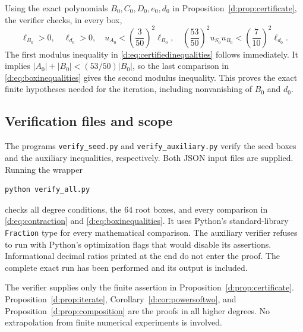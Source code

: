 \documentclass[UTF8,11pt]{ctexart}
\theoremstyle{definition}
\numberwithin{equation}{section}
\begin{document}
Using the exact polynomials $B_0,C_0,D_0,e_0,d_0$ in
Proposition~\ref{d:prop:certificate}, the verifier checks, in every box,
\begin{equation}\label{d:eq:boxinequalities}
 \ell_{B_0}>0,\quad \ell_{d_0}>0,\quad
 u_{A_0}<\left(\frac3{50}\right)^2\ell_{B_0},\quad
 \left(\frac{53}{50}\right)^2u_{S_0}u_{B_0}
 <\left(\frac7{10}\right)^2\ell_{d_0}.
\end{equation}
The first modulus inequality in \eqref{d:eq:certifiedinequalities} follows
immediately. It implies $|A_0|+|B_0|<(53/50)|B_0|$, so the last
comparison in \eqref{d:eq:boxinequalities} gives the second modulus
inequality. This proves the exact finite hypotheses needed for the
iteration, including nonvanishing of $B_0$ and $d_0$.

\subsection{Verification files and scope}
The programs \nolinkurl{verify_seed.py} and
\nolinkurl{verify_auxiliary.py} verify the seed boxes and the auxiliary
inequalities, respectively. Both JSON input files are supplied.
Running the wrapper
\begin{verbatim}
python verify_all.py
\end{verbatim}
checks all degree conditions, the $64$ root boxes, and every comparison
in \eqref{d:eq:contraction} and \eqref{d:eq:boxinequalities}. It uses Python's
standard-library \texttt{Fraction} type for every mathematical comparison.
The auxiliary verifier refuses to run with Python's optimization flags
that would disable its assertions. Informational decimal ratios printed
at the end do not enter the proof. The complete exact run has been
performed and its output is included.

The verifier supplies only the finite assertion in
Proposition~\ref{d:prop:certificate}. Proposition~\ref{d:prop:iterate},
Corollary~\ref{d:cor:powersoftwo}, and
Proposition~\ref{d:prop:composition} are the proofs in all higher degrees.
No extrapolation from finite numerical experiments is involved.
\end{document}
